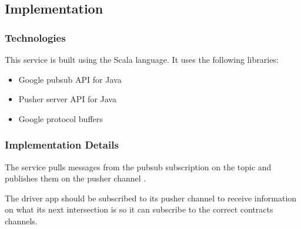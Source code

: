 \documentclass[letterpaper,10pt,english]{sphinxmanual}
\begin{document}
\subsection{Implementation}
\label{\detokenize{microservices/localization_dispatcher/implementation:implementation}}\label{\detokenize{microservices/localization_dispatcher/implementation::doc}}

\subsubsection{Technologies}
\label{\detokenize{microservices/localization_dispatcher/implementation:technologies}}
This service is built using the Scala language.
It uses the following libraries:
\begin{itemize}
\item {} 
Google pubsub API for Java

\item {} 
Pusher server API for Java

\item {} 
Google protocol buffers

\end{itemize}


\subsubsection{Implementation Details}
\label{\detokenize{microservices/localization_dispatcher/implementation:implementation-details}}
The service pulls messages from the pubsub subscription  on the topic  and publishes them on the pusher channel .

The driver app should be subscribed to its pusher channel to receive information on what its next intersection is so it can subscribe to the correct contracts channels.



\renewcommand{\indexname}{Index}
\printindex
\end{document}

